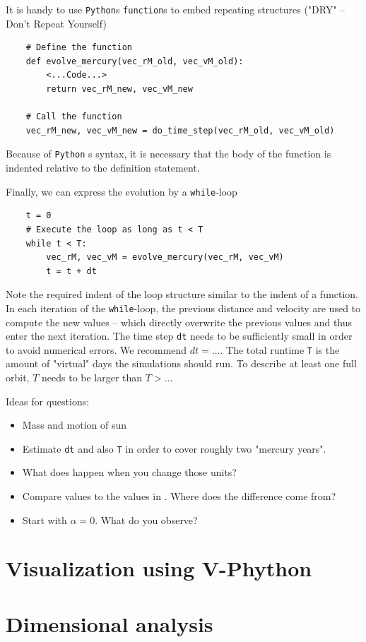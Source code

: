 \documentclass[12pt]{iopart}
\newcommand{\python}[0]{\texttt{Python} }
\begin{document}
It is handy to use \texttt{Python}s \texttt{function}s to embed repeating structures ("DRY" -- Don't Repeat Yourself)
\begin{lstlisting}
	# Define the function
	def evolve_mercury(vec_rM_old, vec_vM_old):
		<...Code...>
		return vec_rM_new, vec_vM_new
	
	# Call the function
	vec_rM_new, vec_vM_new = do_time_step(vec_rM_old, vec_vM_old)
\end{lstlisting}
Because of \python{}s syntax, it is necessary that the body of the function is indented relative to the definition statement.

Finally, we can express the evolution by a \texttt{while}-loop
\begin{lstlisting}
	t = 0
	# Execute the loop as long as t < T
	while t < T:
		vec_rM, vec_vM = evolve_mercury(vec_rM, vec_vM)
		t = t + dt
\end{lstlisting}
Note the required indent of the loop structure similar to the indent of a function.  In each iteration of the \texttt{while}-loop, the previous distance and velocity are used to compute the new values -- which directly overwrite the previous values and thus enter the next iteration. The time step \texttt{dt} needs to be sufficiently small in order to avoid numerical errors.  We recommend $dt = ...$.  The total runtime \texttt{T} is the amount of "virtual" days the simulations should run.  To describe at least one full orbit, $T$ needs to be larger than $T>..$.


Ideas for questions:
\begin{itemize}
	\item Mass and motion of sun
	\item Estimate \texttt{dt} and also \texttt{T} in order to cover roughly two "mercury years".
	\item What does happen when you change those units?
	\item Compare values to the values in \cite{}.  Where does the difference come from?
	\item Start with $\alpha=0$. What do you observe?
\end{itemize}

\section{Visualization using V-Phython}

\section{Dimensional analysis}
\end{document}
